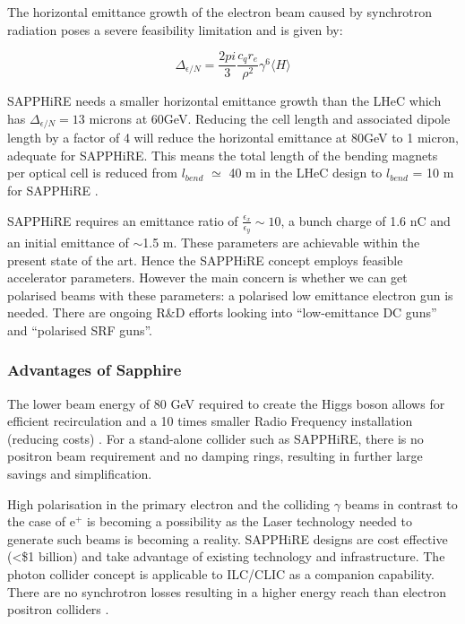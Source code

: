 The horizontal emittance growth of the electron beam caused by synchrotron radiation poses a severe feasibility limitation and is given by:

\begin{equation}
\Delta_{\epsilon/N}=\frac{2pi}{3}\frac{c_{q}r_{e}}{\rho^{2}}\gamma^{6}\langle H \rangle
\end{equation}

SAPPHiRE needs a smaller horizontal emittance growth than the LHeC which has $\Delta_{\epsilon/N} = 13$ microns at 60GeV.  Reducing the cell length and associated dipole length by a factor of 4 will reduce the horizontal emittance at 80GeV to 1 micron, adequate for SAPPHiRE. This means the total length of the bending magnets per optical cell is reduced from $l_{bend}$ $\simeq$ 40 m in the LHeC design to $l_{bend}$ = 10 m for SAPPHiRE \cite{Bogacz:SAPPHiRE}.

SAPPHiRE requires an emittance ratio of $\frac{\epsilon_{x}}{\epsilon_{y}} \sim 10$, a bunch charge of 1.6 nC and an initial emittance of $\sim$1.5 \textmu m. These parameters are achievable within the present state of the art. Hence the SAPPHiRE concept employs feasible accelerator parameters. However the main concern is whether we can get polarised beams with these parameters: a polarised low emittance electron gun is needed. There are ongoing R\&D efforts looking into ``low-emittance DC guns'' and ``polarised SRF guns''. \cite{Zimmermann:SAPPHiRE}

\subsubsection{Advantages of Sapphire}                                                                                                              The lower beam energy of 80 GeV required to create the Higgs boson allows for efficient recirculation and a 10 times smaller Radio Frequency installation (reducing costs) \cite{Bogacz:SAPPHiRE}. For a stand-alone collider such as SAPPHiRE, there is no positron beam requirement and no damping rings, resulting in further large savings and simplification.

High polarisation in the primary electron and the colliding $\gamma$ beams \textendash in contrast to the case of e$^{+}$ \textendash is becoming a possibility as the Laser technology needed to generate such beams is becoming a reality. SAPPHiRE designs are cost effective (\textless \$1 billion) and take advantage of existing technology and infrastructure. The photon collider concept is applicable to ILC/CLIC as a companion capability. There are no synchrotron losses resulting in a higher energy reach than electron positron colliders \cite{Zimmermann:SAPPHiRE}.

